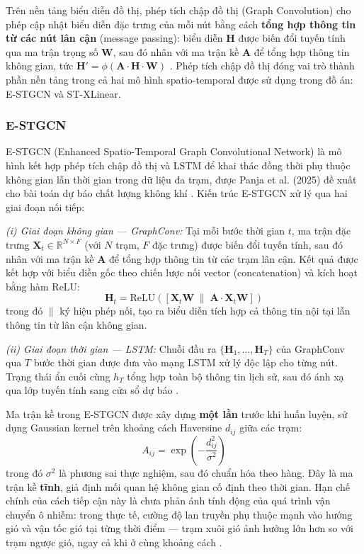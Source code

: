 Trên nền tảng biểu diễn đồ thị, phép tích chập đồ thị (Graph Convolution) cho phép cập nhật biểu diễn đặc trưng của mỗi nút bằng cách \textbf{tổng hợp thông tin từ các nút lân cận} (message passing): biểu diễn $\mathbf{H}$ được biến đổi tuyến tính qua ma trận trọng số $\mathbf{W}$, sau đó nhân với ma trận kề $\mathbf{A}$ để tổng hợp thông tin không gian, tức $\mathbf{H}' = \phi(\mathbf{A} \cdot \mathbf{H} \cdot \mathbf{W})$ \cite{panja2025estgcn}. Phép tích chập đồ thị đóng vai trò thành phần nền tảng trong cả hai mô hình spatio-temporal được sử dụng trong đồ án: E-STGCN và ST-XLinear.

\subsubsection{E-STGCN}

E-STGCN (Enhanced Spatio-Temporal Graph Convolutional Network) là mô hình kết hợp phép tích chập đồ thị và LSTM để khai thác đồng thời phụ thuộc không gian lẫn thời gian trong dữ liệu đa trạm, được Panja et al. (2025) đề xuất cho bài toán dự báo chất lượng không khí \cite{panja2025estgcn}. Kiến trúc E-STGCN xử lý qua hai giai đoạn nối tiếp:

\textit{(i) Giai đoạn không gian --- GraphConv:} Tại mỗi bước thời gian $t$, ma trận đặc trưng $\mathbf{X}_t \in \mathbb{R}^{N \times F}$ (với $N$ trạm, $F$ đặc trưng) được biến đổi tuyến tính, sau đó nhân với ma trận kề $\mathbf{A}$ để tổng hợp thông tin từ các trạm lân cận. Kết quả được kết hợp với biểu diễn gốc theo chiến lược nối vector (concatenation) và kích hoạt bằng hàm ReLU:
\begin{equation}
    \mathbf{H}_t = \text{ReLU}\left(\left[\mathbf{X}_t\mathbf{W} \;\|\; \mathbf{A} \cdot \mathbf{X}_t\mathbf{W}\right]\right)
\end{equation}
trong đó $\|$ ký hiệu phép nối, tạo ra biểu diễn tích hợp cả thông tin nội tại lẫn thông tin từ lân cận không gian.

\textit{(ii) Giai đoạn thời gian --- LSTM:} Chuỗi đầu ra $\{\mathbf{H}_1, \ldots, \mathbf{H}_T\}$ của GraphConv qua $T$ bước thời gian được đưa vào mạng LSTM xử lý độc lập cho từng nút. Trạng thái ẩn cuối cùng $h_T$ tổng hợp toàn bộ thông tin lịch sử, sau đó ánh xạ qua lớp tuyến tính sang cửa sổ dự báo \cite{panja2025estgcn}.

Ma trận kề trong E-STGCN được xây dựng \textbf{một lần} trước khi huấn luyện, sử dụng Gaussian kernel trên khoảng cách Haversine $d_{ij}$ giữa các trạm:
\begin{equation}
    A_{ij} = \exp\left(-\frac{d_{ij}^2}{\sigma^2}\right)
\end{equation}
trong đó $\sigma^2$ là phương sai thực nghiệm, sau đó chuẩn hóa theo hàng. Đây là ma trận kề \textbf{tĩnh}, giả định mối quan hệ không gian cố định theo thời gian. Hạn chế chính của cách tiếp cận này là chưa phản ánh tính động của quá trình vận chuyển ô nhiễm: trong thực tế, cường độ lan truyền phụ thuộc mạnh vào hướng gió và vận tốc gió tại từng thời điểm — trạm xuôi gió ảnh hưởng lớn hơn so với trạm ngược gió, ngay cả khi ở cùng khoảng cách \cite{panja2025estgcn}.

